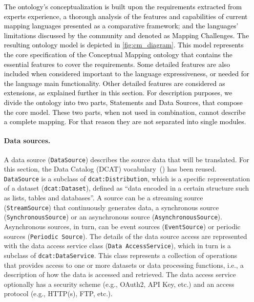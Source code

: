 \textcolor{black}{The ontology's conceptualization is built upon the requirements extracted from experts experience, a thorough analysis of the features and capabilities of current mapping languages presented as a comparative framework; and the languages' limitations discussed by the community and denoted as Mapping Challenges. The resulting ontology model is depicted in \cref{fig:cm_diagram}. This model represents the core specification of the Conceptual Mapping ontology that contains the essential features to cover the requirements. Some detailed features are also included when considered important to the language expressiveness, or needed for the language main functionality. Other detailed features are considered as extensions, as explained further in this section. For description purposes, we divide the ontology into two parts, Statements and Data Sources, that compose the core model. These two parts, when not used in combination, cannot describe a complete mapping. For that reason they are not separated into single modules. } 

\noindent\paragraph{\textbf{Data sources.}} A data source (\texttt{DataSource}) describes the source data that will be translated. For this section, the Data Catalog (DCAT) vocabulary~(\cite{albertoni2020dcat2}) has been reused. \texttt{DataSource} is a subclass of \texttt{dcat:Distribution}, which is a specific representation of a dataset (\texttt{dcat:Dataset}), defined as ``data encoded in a certain structure such as lists, tables and databases''. A source can be a streaming source (\texttt{StreamSource}) that continuously generates data, a synchronous source (\texttt{SynchronousSource}) or an asynchronous source (\texttt{AsynchronousSource}). Asynchronous sources, in turn, can be event sources (\texttt{EventSource}) or periodic sources (\texttt{Periodic Source}). The details of the data source access are represented with the data access service class (\texttt{Data AccessService}), which in turn is a subclass of \texttt{dcat:DataService}. This class represents a collection of operations that provides access to one or more datasets or data processing functions, i.e., a description of how the data is accessed and retrieved. The data access service optionally has a security scheme (e.g., OAuth2, API Key, etc.) and an access protocol (e.g., HTTP(s), FTP, etc.).

